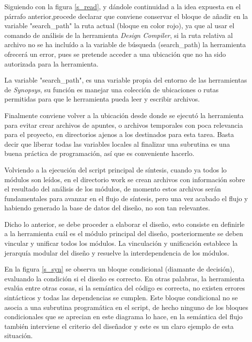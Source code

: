 Siguiendo con la figura \ref{s_read}, y dándole continuidad a la idea expuesta en el párrafo anterior,procede declarar que conviene conservar el bloque de añadir en la variable "search\_path" la ruta actual (bloque en color rojo), ya que al usar el comando de análisis de la herramienta \textit{Design Compiler}, si la ruta relativa al archivo no se ha incluído a la variable de búsqueda (search\_path) la herramienta ofrecerá un error, pues se pretende acceder a una ubicación que no ha sido autorizada para la herramienta.

La variable "search\_path", es una variable propia del entorno de las herramientas de \textit{Synopsys}, su función es manejar una colección de ubicaciones o rutas permitidas para que le herramienta pueda leer y escribir archivos.

Finalmente conviene volver a la ubicación desde donde se ejecutó la herramienta para evitar crear archivos de apuntes, o archivos temporales con poca relevancia para el proyecto, en directorios ajenos a los destinados para esta tarea. Basta decir que liberar todas las variables locales al finalizar una subrutina es una buena práctica de programación, así que es conveniente hacerlo.

Volviendo a la ejecución del script principal de síntesis, cuando ya todos lo módulos son leídos, en el directorio work se crean archivos con información sobre el resultado del análisis de los módulos, de momento estos archivos serán fundamentales para avanzar en el flujo de síntesis, pero una vez acabado el flujo y habiendo generado la base de datos del diseño, no son tan relevantes.


Dicho lo anterior, se debe proceder a elaborar el diseño, esto consiste en definirle a la herramienta cuál es el módulo principal del diseño, posteriormente se deben vincular y unificar todos los módulos. La vinculación y unificación establece la jerarquía modular del diseño y resuelve la interdependencia de los módulos.

En la figura \ref{s_syn} se observa un bloque condicional (diamante de decisión), evaluando la condición si el diseño es correcto. En otras palabras, la herramienta evalúa entre otras cosas, si la semántica del código es correcta, no existen errores sintácticos y todas las dependencias se cumplen. Este bloque condicional no se asocia a una subrutina programática en el script, de hecho ninguno de los bloques condicionales que se aprecian en este diagrama lo hace, en la semántica del flujo también interviene el criterio del diseñador y este es un claro ejemplo de esta situación.

